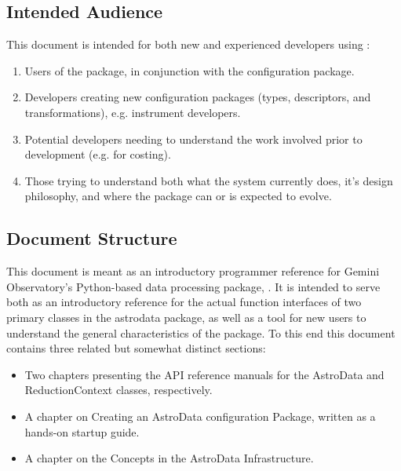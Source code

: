 \documentclass[letterpaper,10pt,english]{sphinxmanual}
\begin{document}
\subsection{Intended Audience}
\label{gen.ADMANUAL_Purpose:intended-audience}
This document is intended for both new and experienced developers using
:
\begin{enumerate}
\item {} 
Users of the  package, in conjunction with the
 configuration package.

\item {} 
Developers creating new configuration packages (types,
descriptors, and transformations), e.g. instrument developers.

\item {} 
Potential developers needing to understand the work involved prior
to development (e.g. for costing).

\item {} 
Those trying to understand both what the system currently does,
it's design philosophy, and where the package can or is expected to
evolve.

\end{enumerate}


\subsection{Document Structure}
\label{gen.ADMANUAL_Purpose:document-structure}
This document is meant as an introductory programmer reference for Gemini
Observatory's Python-based data processing package, . It is
intended to serve both as an introductory reference for the actual
function interfaces of two primary classes in the astrodata package,
as well as a tool for new users to understand the general
characteristics of the package. To this end this document contains
three related but somewhat distinct sections:
\begin{itemize}
\item {} 
Two chapters presenting the API reference
manuals for the AstroData and ReductionContext classes, respectively.

\item {} 
A chapter on Creating an AstroData configuration Package, written as
a hands-on startup guide.

\item {} 
A chapter on the Concepts in the AstroData Infrastructure.

\end{itemize}
\end{document}
